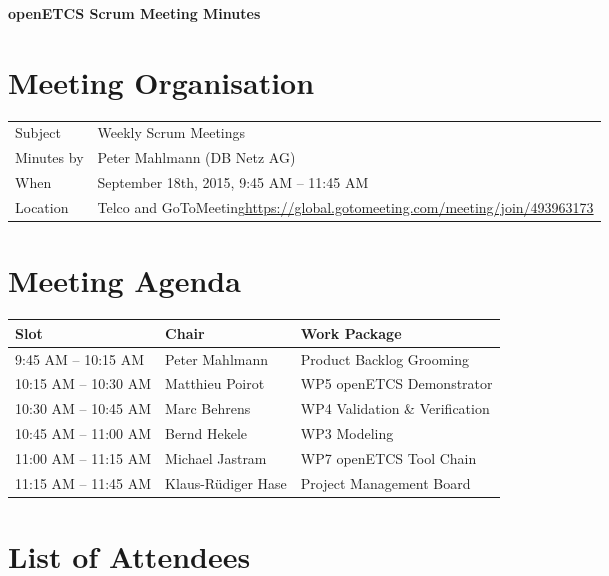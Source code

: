 \documentclass[a4paper, 11pt]{article}
\begin{document}
{\begin{center}\huge\bf openETCS Scrum Meeting Minutes\end{center}}

\section{Meeting Organisation}

\renewcommand{\arraystretch}{1.5}
\begin{supertabular}{m{.2\textwidth}m{.8\textwidth}}
Subject & Weekly Scrum Meetings\\
Minutes by & Peter Mahlmann (DB Netz AG)\\
When & September 18th, 2015, 9:45 AM -- 11:45 AM\\
Location & Telco and GoToMeeting\newline \url{https://global.gotomeeting.com/meeting/join/493963173}\\
\end{supertabular}

\renewcommand{\arraystretch}{1.0}
\section{Meeting Agenda}

\begin{tabular}{lll}
\toprule
\textbf{Slot} &  \textbf{Chair} & \textbf{Work Package} \\
\midrule 
9:45 AM -- 10:15 AM & Peter Mahlmann & Product Backlog Grooming  \\
10:15 AM -- 10:30 AM & Matthieu Poirot & WP5 openETCS Demonstrator \\  
10:30 AM -- 10:45 AM & Marc Behrens & WP4 Validation \& Verification \\
10:45 AM -- 11:00 AM & Bernd Hekele & WP3 Modeling \\
11:00 AM -- 11:15 AM & Michael Jastram & WP7 openETCS Tool Chain \\
11:15 AM -- 11:45 AM & Klaus-R\"udiger Hase & Project Management Board \\
\bottomrule
\end{tabular}

\section{List of Attendees}
\end{document}
